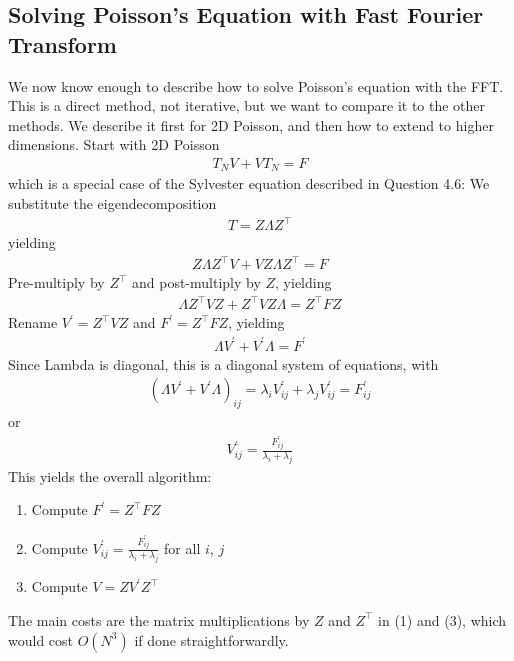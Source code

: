 \documentclass[11pt]{article}
\numberwithin{equation}{section}
\begin{document}
\subsection{Solving Poisson's Equation with Fast Fourier Transform}
We now know enough to describe how to solve Poisson's equation with the FFT. This is a direct method, not iterative, but we want to compare it to the other methods.
We describe it first for 2D Poisson, and then how to extend to higher dimensions. Start with 2D Poisson \begin{align*}
    T_N V + V T_N = F
\end{align*}
which is a special case of the Sylvester equation described in Question 4.6: We substitute the eigendecomposition \begin{align*}
    T=Z \Lambda Z^{\top}
\end{align*} yielding \begin{align*}
    Z\Lambda Z^{\top} V+V Z{\Lambda} Z^{\top}=F
\end{align*}
Pre-multiply by $Z^\top$ and post-multiply by $Z$, yielding \begin{align*}
    \Lambda Z^{\top} VZ + Z^{\top} VZ \Lambda = Z^{\top} FZ
\end{align*}
Rename $V^\prime = Z^\top VZ$ and $F^\prime = Z^\top FZ$, yielding \begin{align*}
    \Lambda V^\prime + V^\prime \Lambda = F^\prime
\end{align*}
Since Lambda is diagonal, this is a diagonal system of equations, with \begin{align*}
    \left( \Lambda V^\prime + V^\prime \Lambda \right)_{ij} = \lambda_i V^\prime_{ij} + \lambda_j V^\prime_{ij} = F^\prime_{ij}
\end{align*} or \begin{align*}
    V^\prime_{ij} = \frac{F^\prime_{ij}}{\lambda_i + \lambda_j}
\end{align*}
This yields the overall algorithm:
\begin{algorithmfrm}
    \begin{enumerate}
        \item Compute $F^\prime = Z^\top FZ$
        \item Compute $V^\prime_{ij} = \frac{F^\prime_{ij}}{\lambda_i + \lambda_j}$ for all $i$, $j$
        \item Compute $V=ZV^\prime Z^\top$
    \end{enumerate}
\end{algorithmfrm}
The main costs are the matrix multiplications by $Z$ and $Z^\top$ in (1) and (3), which would cost $O(N^3)$ if done straightforwardly.
\end{document}
